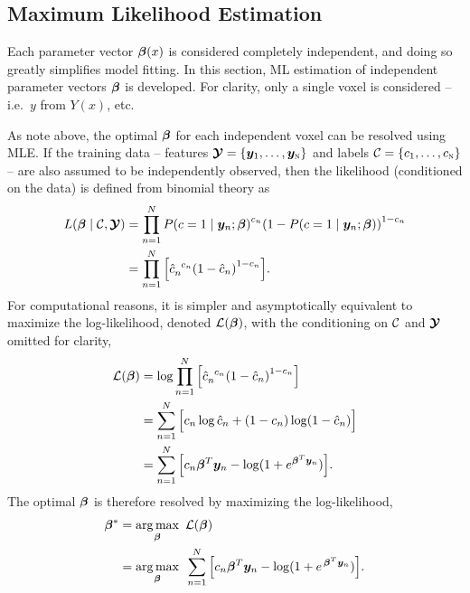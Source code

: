 \subsection{Maximum Likelihood Estimation}
Each parameter vector $\bm{\beta}(x)$ is considered completely independent,
and doing so greatly simplifies model fitting.
In this section, ML estimation of independent parameter vectors $\bm{\beta}$ is developed.
For clarity, only a single voxel is considered -- i.e.\ $y$ from $Y(x)$, etc.
\par
As note above, the optimal $\bm{\beta}$ for each independent voxel can be resolved using MLE.
If the training data --
features $\bm{\mathcal{Y}} = \{\bm{y}_1,\dots,\bm{y}_{\textsc{n}}\}$ and
labels $\mathcal{C} = \{c_1,\dots,c_{\textsc{n}}\}$
-- are also assumed to be independently observed,
then the likelihood (conditioned on the data) is defined from binomial theory as
\begin{align}
  L(\bb\mid\C,\bY) &= \prod_{n=1}^{N} {P(c=1\mid\by_n;\bb)}^{c_n}
                              {\left(1-P(c=1\mid\by_n;\bb)\right)}^{1-c_n}\nonumber\\
                   &= \prod_{n=1}^{N} \Big[\hat{c}_n^{\en c_n}
                                  {\left(1-\hat{c}_n\right)}^{1-c_n}\Big].%
  \label{eq:likelihood}
\end{align}
For computational reasons, it is simpler and asymptotically equivalent to
maximize the log-likelihood, denoted $\mathcal{L}(\bm{\beta})$,
with the conditioning on $\mathcal{C}$ and $\bm{\mathcal{Y}}$ omitted for clarity,
\begin{align}
  \L(\bb) &= \log{ \prod_{n=1}^{N} \Big[\hat{c}_n^{\en c_n}
                               {\left(1-\hat{c}_n\right)}^{1-c_n}\Big] }\nonumber\\
          &= \sum_{n=1}^{N} \Big[ c_n \log \hat{c}_n + (1-c_n) \log (1-\hat{c}_n) \Big] \nonumber\\
          &= \sum_{n=1}^{N} \Big[ c_n \bb^T\by_n - \log (1+e^{\bb^T\by_n}) \Big].%
  \label{eq:loglikelihood}
\end{align}
The optimal $\bm{\beta}$ is therefore resolved by maximizing the log-likelihood,
\begin{align}
  \bb^* &= \underset{\bb}{\arg\max}\en\L(\bb)\nonumber\\
        &= \underset{\bb}{\arg\max}\en\sum_{n=1}^{N}
             \Big[ c_n \bb^T\by_n - \log (1+e^{\et\bb^T\by_n}) \Big].%
  \label{eq:argmaxmle}
\end{align}
